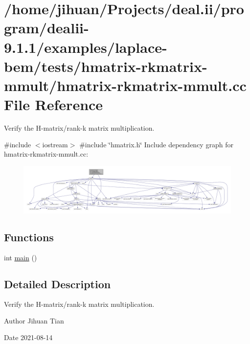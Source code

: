 \hypertarget{hmatrix-rkmatrix-mmult_8cc}{}\section{/home/jihuan/\+Projects/deal.ii/program/dealii-\/9.1.1/examples/laplace-\/bem/tests/hmatrix-\/rkmatrix-\/mmult/hmatrix-\/rkmatrix-\/mmult.cc File Reference}
\label{hmatrix-rkmatrix-mmult_8cc}


Verify the H-\/matrix/rank-\/k matrix multiplication.  


{\ttfamily \#include $<$iostream$>$}\newline
{\ttfamily \#include \char`\"{}hmatrix.\+h\char`\"{}}\newline
Include dependency graph for hmatrix-\/rkmatrix-\/mmult.cc\+:\nopagebreak
\begin{figure}[H]
\begin{center}
\leavevmode
\includegraphics[width=350pt]{hmatrix-rkmatrix-mmult_8cc__incl}
\end{center}
\end{figure}
\subsection*{Functions}
\begin{DoxyCompactItemize}
\item 
int \hyperlink{hmatrix-rkmatrix-mmult_8cc_ae66f6b31b5ad750f1fe042a706a4e3d4}{main} ()
\end{DoxyCompactItemize}


\subsection{Detailed Description}
Verify the H-\/matrix/rank-\/k matrix multiplication. 

\begin{DoxyAuthor}{Author}
Jihuan Tian 
\end{DoxyAuthor}
\begin{DoxyDate}{Date}
2021-\/08-\/14 
\end{DoxyDate}


